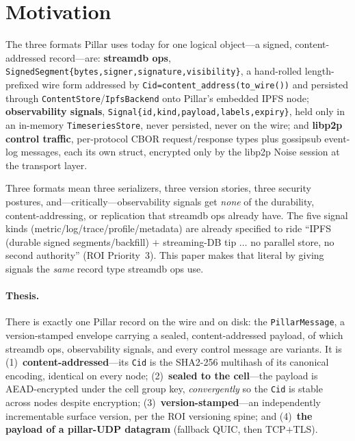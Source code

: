 \documentclass[10pt,twocolumn]{article}
\newcommand{\code}[1]{\texttt{\small #1}}
\newcommand{\Cid}{\code{Cid}}
\begin{document}
\section{Motivation}
The three formats Pillar uses today for one logical object---a signed,
content-addressed record---are: \textbf{streamdb ops},
\code{SignedSegment\{bytes,signer,signature,visibility\}}, a hand-rolled
length-prefixed wire form addressed by \code{Cid=content\_address(to\_wire())} and
persisted through \code{ContentStore}/\code{IpfsBackend} onto Pillar's embedded
IPFS node; \textbf{observability signals},
\code{Signal\{id,kind,payload,labels,expiry\}}, held only in an in-memory
\code{TimeseriesStore}, never persisted, never on the wire; and \textbf{libp2p
control traffic}, per-protocol CBOR request/response types plus gossipsub
event-log messages, each its own struct, encrypted only by the libp2p Noise
session at the transport layer.

Three formats mean three serializers, three version stories, three security
postures, and---critically---observability signals get \emph{none} of the
durability, content-addressing, or replication that streamdb ops already have. The
five signal kinds (metric/log/trace/profile/metadata) are already specified to
ride ``IPFS (durable signed segments/backfill) $+$ streaming-DB tip $\dots$ no
parallel store, no second authority'' (ROI Priority~3). This paper makes that
literal by giving signals the \emph{same} record type streamdb ops use.

\paragraph{Thesis.} There is exactly one Pillar record on the wire and on disk:
the \code{PillarMessage}, a version-stamped envelope carrying a sealed,
content-addressed payload, of which streamdb ops, observability signals, and every
control message are variants. It is (1)~\textbf{content-addressed}---its \Cid{} is
the SHA2-256 multihash of its canonical encoding, identical on every node;
(2)~\textbf{sealed to the cell}---the payload is AEAD-encrypted under the cell
group key, \emph{convergently} so the \Cid{} is stable across nodes despite
encryption; (3)~\textbf{version-stamped}---an independently incrementable surface
version, per the ROI versioning spine; and (4)~\textbf{the payload of a pillar-UDP
datagram} (fallback QUIC, then TCP$+$TLS).
\end{document}
